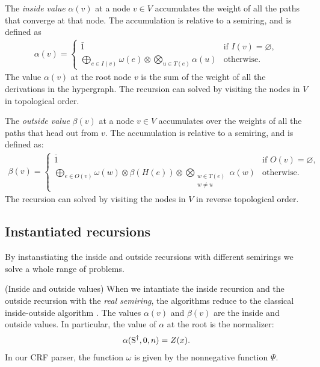   \begin{definition}{} The \textit{inside value} $\alpha(v)$ at a node $v \in V$ accumulates the weight of all the paths that converge at that node. The accumulation is relative to a semiring, and is defined as
  \begin{align*}
    \alpha(v) =
      \begin{cases}
        \bar{1}  &  \mbox{if } I(v) = \varnothing,  \\
        \displaystyle\bigoplus_{e \in I(v)} \omega(e) \otimes \displaystyle\bigotimes_{u \in T(e)} \alpha(u)  & \mbox{otherwise.}
      \end{cases}
  \end{align*}
  The value $\alpha(v)$ at the root node $v$ is the sum of the weight of all the derivations in the hypergraph. The recursion can solved by visiting the nodes in $V$ in topological order.
  \end{definition}

  \begin{definition}{} The \textit{outside value} $\beta(v)$ at a node $v \in V$ accumulates over the weights of all the paths that head out from $v$. The accumulation is relative to a semiring, and is defined as:
  \begin{align*}
    \beta(v) =
      \begin{cases}
        \bar{1}  & \mbox{if } O(v) = \varnothing, \\
        \displaystyle\bigoplus_{e \in O(v)} \omega(w) \otimes \beta(H(e)) \otimes \displaystyle\bigotimes_{ \substack{ w \in T(e) \\ w \neq u } } \alpha(w)  & \mbox{otherwise.}
      \end{cases}
  \end{align*}
  The recursion can solved by visiting the nodes in $V$ in reverse topological order.
  \end{definition}

\subsection{Instantiated recursions}

By instanstiating the inside and outside recursions with different semirings we solve a whole range of problems.

\begin{example}{(Inside and outside values)}
  When we intantiate the inside recursion and the outside recursion with the \textit{real semiring}, the algorithms reduce to the classical inside-outside algorithm \citep{baker1979trainable}. The values $\alpha(v)$ and $\beta(v)$ are the inside and outside values. In particular, the value of $\alpha$ at the root is the normalizer:
  \begin{align*}
    \alpha(\text{S}^{\dagger}, 0, n) = Z(x).
  \end{align*}
  In our CRF parser, the function $\omega$ is given by the nonnegative function $\Psi$.
\end{example}

